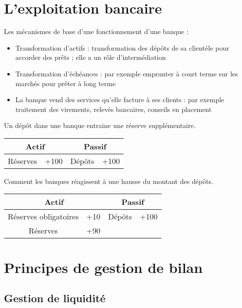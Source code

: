 	\section{L'exploitation bancaire}
	
	Les mécanismes de base d'une fonctionnement d'une banque :
	
	\begin{itemize}
		\item Transformation d'actifs : transformation des dépôts de sa clientèle pour accorder des prêts ; elle a un rôle d'intermédiation
		\item Transformation d'échéances : par exemple emprunter à court terme sur les marchés pour prêter à long terme
		\item La banque vend des services qu'elle facture à ses clients : par exemple traitement des virements, relevés bancaires, conseils en placement
	\end{itemize}
	
	Un dépôt dans une banque entraine une réserve supplémentaire.
	
\begin{center}
	\begin{tabular}{|c|c|c|c|}
	\hline 
	\multicolumn{2}{|c|}{Actif} & \multicolumn{2}{|c|}{Passif} \\ 
	\hline 
	Réserves & +100 & Dépôts & +100 \\ 
	\hline 
	\end{tabular} 
\end{center}

	Comment les banques réagissent à une hausse du montant des dépôts.
	
	\begin{center}
	\begin{tabular}{|c|c|c|c|}
	\hline 
	\multicolumn{2}{|c|}{Actif} & \multicolumn{2}{|c|}{Passif} \\ 
	\hline 
	Réserves obligatoires & +10 & Dépôts & +100 \\ 
	\hline 
	Réserves & +90 & & \\ 
	\hline 
	\end{tabular} 
\end{center}
	
	\section{Principes de gestion de bilan}
	
	\subsection{Gestion de liquidité}
	
